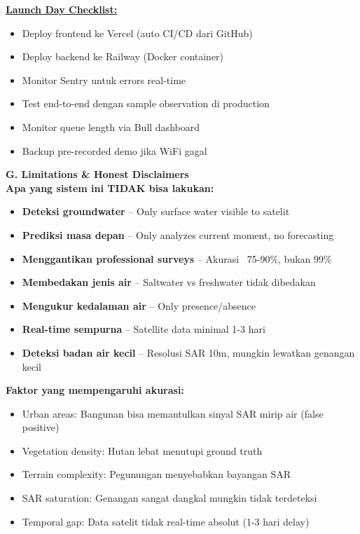 \documentclass[12pt,a4paper]{article}
\newcommand{\subsectionbox}[1]{%
  \textbf{\large #1}\\[0.3cm]
}
\begin{document}
\textbf{\underline{Launch Day Checklist:}}
\begin{itemize}
  \item Deploy frontend ke Vercel (auto CI/CD dari GitHub)
  \item Deploy backend ke Railway (Docker container)
  \item Monitor Sentry untuk errors real-time
  \item Test end-to-end dengan sample observation di production
  \item Monitor queue length via Bull dashboard
  \item Backup pre-recorded demo jika WiFi gagal
\end{itemize}

\vspace{0.5cm}

\subsectionbox{G. Limitations \& Honest Disclaimers}

\textbf{Apa yang sistem ini TIDAK bisa lakukan:}
\begin{itemize}
  \item \textbf{Deteksi groundwater} -- Only surface water visible to satelit
  \item \textbf{Prediksi masa depan} -- Only analyzes current moment, no forecasting
  \item \textbf{Menggantikan professional surveys} -- Akurasi ~75-90\%, bukan 99\%
  \item \textbf{Membedakan jenis air} -- Saltwater vs freshwater tidak dibedakan
  \item \textbf{Mengukur kedalaman air} -- Only presence/absence
  \item \textbf{Real-time sempurna} -- Satellite data minimal 1-3 hari
  \item \textbf{Deteksi badan air kecil} -- Resolusi SAR 10m, mungkin lewatkan genangan kecil
\end{itemize}

\textbf{Faktor yang mempengaruhi akurasi:}
\begin{itemize}
  \item Urban areas: Bangunan bisa memantulkan sinyal SAR mirip air (false positive)
  \item Vegetation density: Hutan lebat menutupi ground truth
  \item Terrain complexity: Pegunungan menyebabkan bayangan SAR
  \item SAR saturation: Genangan sangat dangkal mungkin tidak terdeteksi
  \item Temporal gap: Data satelit tidak real-time absolut (1-3 hari delay)
\end{itemize}
\end{document}
